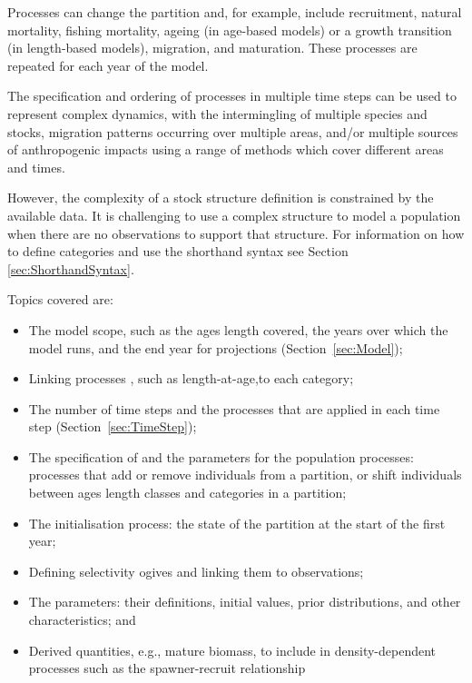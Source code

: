 Processes can change the partition and, for example, include recruitment, natural mortality, fishing mortality, ageing (in age-based models) or a growth transition (in length-based models), migration, and maturation. These processes are repeated for each year of the model.

The specification and ordering of processes in multiple time steps can be used to represent complex dynamics, with the intermingling of multiple species and stocks, migration patterns occurring over multiple areas, and/or multiple sources of anthropogenic impacts using a range of methods which cover different areas and times.

However, the complexity of a stock structure definition is constrained by the available data. It is challenging to use a complex structure to model a population when there are no observations to support that structure.  For information on how to define categories and use the shorthand syntax see Section \ref{sec:ShorthandSyntax}.

Topics covered are:

\begin{itemize}
	\item The model scope, such as the \ifAgeBased ages \else length \fi covered, the years over which the model runs, and the end year for projections (Section~\ref{sec:Model});
    \item Linking processes \ifAgeBased, such as length-at-age,\fi to each category;
    \item The number of time steps and the processes that are applied in each time step (Section~\ref{sec:TimeStep});
    \item The specification of and the parameters for the population processes: processes that add or remove individuals from a partition, or shift individuals between \ifAgeBased ages \else length classes \fi and categories in a partition;
    \item The initialisation process: the state of the partition at the start of the first year;
   \item Defining selectivity ogives and linking them to observations;
   \item The parameters: their definitions, initial values, prior distributions, and other characteristics; and
   \item Derived quantities, e.g., mature biomass, to include in density-dependent processes such as the spawner-recruit relationship
\end{itemize}

